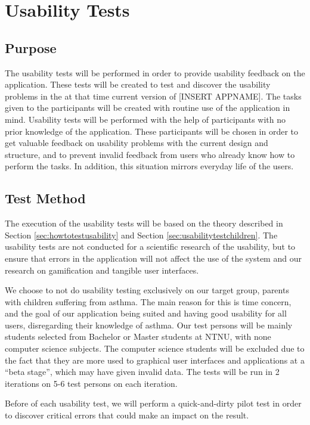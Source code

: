 \chapter{Usability Tests}
\label{chp:usabilitytests}


\section{Purpose}
\label{sec:usabilitypurpose}
The usability tests will be performed in order to provide usability feedback on the application. These tests will be created to test and discover the usability problems in the at that time current version of [INSERT APPNAME]. The tasks given to the participants will be created with routine use of the application in mind. Usability tests will be performed with the help of participants with no prior knowledge of the application. These participants will be chosen in order to get valuable feedback on usability problems with the current design and structure, and to prevent invalid feedback from users who already know how to perform the tasks. In addition, this situation mirrors everyday life of the users.


\section{Test Method}
The execution of the usability tests will be based on the theory described in Section \ref{sec:howtotestusability} and Section \ref{sec:usabilitytestchildren}. The usability tests are not conducted for a scientific research of the usability, but to ensure that errors in the application will not affect the use of the system and our research on gamification and tangible user interfaces.

We choose to not do usability testing exclusively on our target group, parents with children suffering from asthma. The main reason for this is time concern, and the goal of our application being suited and having good usability for all users, disregarding their knowledge of asthma. Our test persons will be mainly students selected from Bachelor or Master students at NTNU, with none computer science subjects. The computer science students will be excluded due to the fact that they are more used to graphical user interfaces and applications at a ``beta stage'', which may have given invalid data. The tests will be run in 2 iterations on 5-6 test persons on each iteration. 

Before of each usability test, we will perform a quick-and-dirty pilot test in order to discover critical errors that could make an impact on the result.

